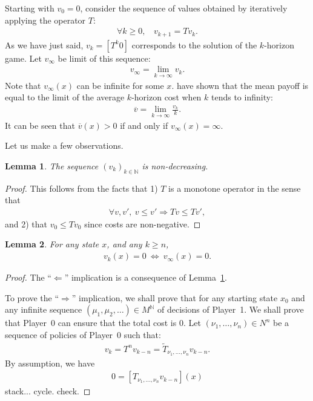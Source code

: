 \documentclass{article}
\newtheorem{lemma}{Lemma}
\def\N{\mathbb N}
\def\v{\overline v}
\def\pa{Player~0}
\def\pb{Player~1}
\begin{document}
Starting with $v_0=0$, consider the sequence of values obtained by iteratively applying the operator $T$:
\begin{align}
 \forall k\ge 0,~~~~ v_{k+1} = T v_k.
\end{align}
As we have just said, $v_k=[T^k0]$ corresponds to the solution of the $k$-horizon game.
Let $v_\infty$ be limit of this sequence:
\begin{align}
  v_\infty = \lim_{k \to \infty} v_k.
\end{align}
Note that $v_\infty(x)$ can be infinite for some $x$.
\citet{zwick96} have shown that the mean payoff is equal to the limit of the average $k$-horizon cost when $k$ tends to infinity:
\begin{align}
\v = \lim_{k \to \infty} \frac{v_k}{k}.
\end{align}
It can be seen that $\v(x)>0$ if and only if $v_\infty(x)=\infty$.

Let us make a few observations.
\begin{lemma}\label{monotonicity}
The sequence $(v_k)_{k \in \N}$ is non-decreasing.
\end{lemma}
\begin{proof}
  This follows from the facts that 1) $T$ is a monotone operator in the sense that
  \begin{align}
    \forall v,v',~ v \le v' \Rightarrow Tv \le Tv',
  \end{align}
  and 2) that $v_0 \le T v_0$ since costs are non-negative.
\end{proof}


\begin{lemma}
  For any state $x$, and any $k \ge n$,
  \begin{align}
    v_k(x) = 0 ~\Longleftrightarrow~ v_\infty(x)=0.
  \end{align}
\end{lemma}
\begin{proof}
  The ``$\Leftarrow$'' implication is a consequence of Lemma~\ref{monotonicity}.
  
  To prove the ``$\Rightarrow$'' implication, we shall prove that for any starting state $x_0$ and any infinite sequence $(\mu_1,\mu_2,\dots) \in M^\N$ of decisions of \pb. We shall prove that \pa{ }can ensure that the total cost is 0. 
  Let $(\nu_1,\dots,\nu_n) \in N^n$ be a sequence of policies of \pa{ }such that:
  \begin{align}
    v_k = T^n v_{k-n} = \tilde T_{\nu_1,\dots,\nu_n} v_{k-n}. 
  \end{align}
  By assumption, we have
  \begin{align}
    0 = [T_{\nu_1,\dots,\nu_n} v_{k-n}](x)
  \end{align}
   stack... cycle. check.
\end{proof}
\end{document}
